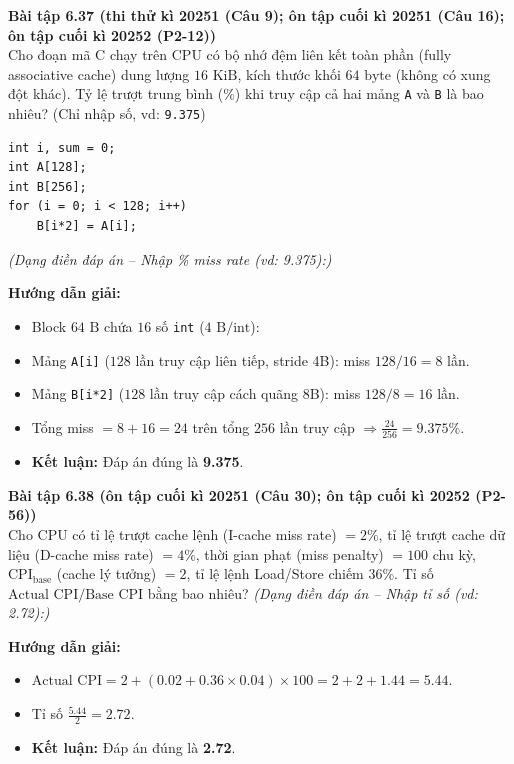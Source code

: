 \textbf{Bài tập 6.37 (thi thử kì 20251 (Câu 9); ôn tập cuối kì 20251 (Câu 16); ôn tập cuối kì 20252 (P2-12))}\\
Cho đoạn mã C chạy trên CPU có bộ nhớ đệm liên kết toàn phần (fully associative cache) dung lượng $16\text{ KiB}$, kích thước khối $64\text{ byte}$ (không có xung đột khác). Tỷ lệ trượt trung bình ($\%$) khi truy cập cả hai mảng \texttt{A} và \texttt{B} là bao nhiêu? (Chỉ nhập số, vd: \texttt{9.375})
\begin{lstlisting}
int i, sum = 0;
int A[128];
int B[256];
for (i = 0; i < 128; i++)
    B[i*2] = A[i];
\end{lstlisting}
\textit{(Dạng điền đáp án -- Nhập \% miss rate (vd: 9.375):)}\par
\textbf{Hướng dẫn giải:}
\begin{itemize}
    \item Block $64\text{ B}$ chứa $16$ số \texttt{int} ($4\text{ B/int}$):
    \item Mảng \texttt{A[i]} ($128$ lần truy cập liên tiếp, stride 4B): miss $128/16 = 8$ lần.
    \item Mảng \texttt{B[i*2]} ($128$ lần truy cập cách quãng 8B): miss $128/8 = 16$ lần.
    \item Tổng miss $= 8 + 16 = 24$ trên tổng $256$ lần truy cập $\Rightarrow \frac{24}{256} = \mathbf{9.375\%}$.
    \item \textbf{Kết luận:} Đáp án đúng là \textbf{9.375}.
\end{itemize}

\textbf{Bài tập 6.38 (ôn tập cuối kì 20251 (Câu 30); ôn tập cuối kì 20252 (P2-56))}\\
Cho CPU có tỉ lệ trượt cache lệnh (I-cache miss rate) $= 2\%$, tỉ lệ trượt cache dữ liệu (D-cache miss rate) $= 4\%$, thời gian phạt (miss penalty) $= 100$ chu kỳ, $\text{CPI}_{\text{base}}$ (cache lý tưởng) $= 2$, tỉ lệ lệnh Load/Store chiếm $36\%$. Tỉ số $\text{Actual CPI} / \text{Base CPI}$ bằng bao nhiêu?
\textit{(Dạng điền đáp án -- Nhập tỉ số (vd: 2.72):)}\par
\textbf{Hướng dẫn giải:}
\begin{itemize}
    \item $\text{Actual CPI} = 2 + (0.02 + 0.36 \times 0.04) \times 100 = 2 + 2 + 1.44 = 5.44$.
    \item Tỉ số $\frac{5.44}{2} = \mathbf{2.72}$.
    \item \textbf{Kết luận:} Đáp án đúng là \textbf{2.72}.
\end{itemize}

